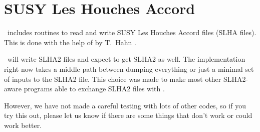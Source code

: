 
\section{SUSY Les Houches Accord}

\ds\ includes routines to read and write SUSY Les Houches Accord 
\cite{slha,slha2} files (SLHA
files). This is done with the help of  by T.~Hahn \cite{slhalib}.

\ds\ will write SLHA2 files and expect to get SLHA2 as well. The implementation
right now takes a middle path between dumping everything or just
a minimal set of inputs to the SLHA2 file. This choice was made to make most
other SLHA2-aware programs able to exchange SLHA2 files with \ds.

However, we have not made a careful testing with lots of other codes, so
if you try this out, please let us know if there are some things that don't
work or could work better.

